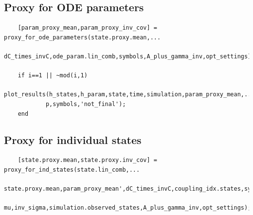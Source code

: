 \subsection{ Proxy for ODE parameters }
\color{RoyalPurple}\begin{verbatim}
    [param_proxy_mean,param_proxy_inv_cov] = proxy_for_ode_parameters(state.proxy.mean,...
        dC_times_invC,ode_param.lin_comb,symbols,A_plus_gamma_inv,opt_settings);

    if i==1 || ~mod(i,1)
        plot_results(h_states,h_param,state,time,simulation,param_proxy_mean,...
            p,symbols,'not_final');
    end
\end{verbatim}
\color{black}

\subsection{Proxy for individual states}
\color{RoyalPurple}\begin{verbatim}
    [state.proxy.mean,state.proxy.inv_cov] = proxy_for_ind_states(state.lin_comb,...
        state.proxy.mean,param_proxy_mean',dC_times_invC,coupling_idx.states,symbols,...
        mu,inv_sigma,simulation.observed_states,A_plus_gamma_inv,opt_settings);
\end{verbatim}

